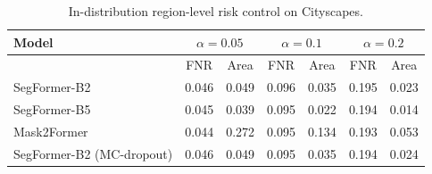 \begin{table}[t]
\centering
\caption{In-distribution region-level risk control on Cityscapes.}
\label{tab:validity_cityscapes}
\footnotesize
\setlength{\tabcolsep}{3pt}
\begin{tabular}{lcccccc}
\toprule
Model & \multicolumn{2}{c}{$\alpha=0.05$} & \multicolumn{2}{c}{$\alpha=0.1$} & \multicolumn{2}{c}{$\alpha=0.2$} \\
\midrule
 & FNR & Area & FNR & Area & FNR & Area \\
\midrule
SegFormer-B2 & 0.046 & 0.049 & 0.096 & 0.035 & 0.195 & 0.023 \\
SegFormer-B5 & 0.045 & 0.039 & 0.095 & 0.022 & 0.194 & 0.014 \\
Mask2Former & 0.044 & 0.272 & 0.095 & 0.134 & 0.193 & 0.053 \\
SegFormer-B2 (MC-dropout) & 0.046 & 0.049 & 0.095 & 0.035 & 0.194 & 0.024 \\
\bottomrule
\end{tabular}
\end{table}
